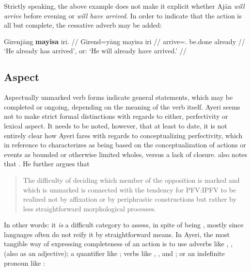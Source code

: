 Strictly speaking, the above example does not make it explicit whether Ajān 
\emph{will arrive} before evening or \emph{will have arrived}. In order to 
indicate that the action is all but complete, the cessative adverb 
 may be added:

\ex
\begingl
	\gla Girenjāng \textbf{mayisa} iri. //
	\glb Girend=yāng mayisa iri //
	\glc arrive=\TsgM{}.\Aarg{} be.done already //
	\glft `He already has arrived', or: `He will already have arrived.' //
\endgl
\xe



\subsection{Aspect}
\label{subsec:aspect}

Aspectually unmarked verb forms indicate general statements, which may be 
completed or ongoing, depending on the meaning of the verb itself. Ayeri 
seems not to make strict formal distinctions with regards to either, 
perfectivity or lexical aspect. It needs to be noted, however, that at least 
to date, it is not entirely clear how Ayeri fares with regards to 
conceptualizing perfectivity, which \citet[76]{dahl1985} in reference to 
\citet[16]{comrie1976} characterizes as being based on the conceptualization of 
actions or events as bounded or otherwise limited wholes, versus a lack of 
closure. \citeauthor{dahl1985} also notes that . He further argues that

\blockcquote[73]{dahl1985}{The difficulty of deciding which member of the 
opposition is marked and which is unmarked is connected with the tendency for 
PFV:IPFV to be realized not by affixation or by periphrastic constructions but 
rather by less straightforward morphological processes.}

In other words: it \emph{is} a difficult category to assess, in spite of being 
, 
mostly since languages often do not reify it by straightforward means. In 
Ayeri, the most tangible way of expressing completeness of an action is 
to use adverbs like , , 
 (also as an adjective); a quantifier 
like ; verbs like , 
, and ; or an indefinite pronoun 
like :

